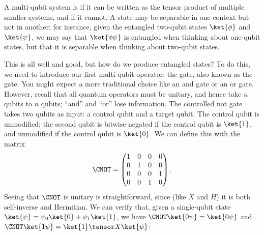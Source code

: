 \begin{definition}%
\label{def:separable-entangled}
  A multi-qubit system is  if it can be written as the tensor
  product of multiple smaller systems, and  if it cannot.  A
  state may be separable in one context but not in another; for instance, given
  the entangled two-qubit states $\ket{\phi}$ and $\ket{\psi}$, we may say that
  $\ket{\phi\psi}$ is entangled when thinking about one-qubit states, but that
  it is separable when thinking about two-qubit states.
\end{definition}

This is all well and good, but how do we produce entangled states?  To do this,
we need to introduce our first multi-qubit operator: the 
gate, also known as the  gate.  You might expect a more traditional
choice like an and gate or an or gate.  However, recall that all quantum
operators must be unitary, and hence take $n$ qubits to $n$ qubits; ``and'' and
``or'' lose information.  The controlled not gate takes two qubits as input: a
control qubit and a target qubit.  The control qubit is unmodified; the second
qubit is bitwise negated if the control qubit is $\ket{1}$, and unmodified if
the control qubit is $\ket{0}$.  We can define this with the matrix \[
  \CNOT = \begin{pmatrix} 1 & 0 & 0 & 0 \\
                          0 & 1 & 0 & 0 \\
                          0 & 0 & 0 & 1 \\
                          0 & 0 & 1 & 0 \end{pmatrix}.
\] Seeing that $\CNOT$ is unitary is straightforward, since (like $X$ and $H$)
it is both self-inverse and Hermitian.  We can verify that, given a single-qubit
state $\ket{\psi} = \psi_0\ket{0} + \psi_1\ket{1}$, we have $\CNOT\ket{0\psi} =
\ket{0\psi}$ and $\CNOT\ket{1\psi} = \ket{1} \tensor X\ket{\psi}$:
